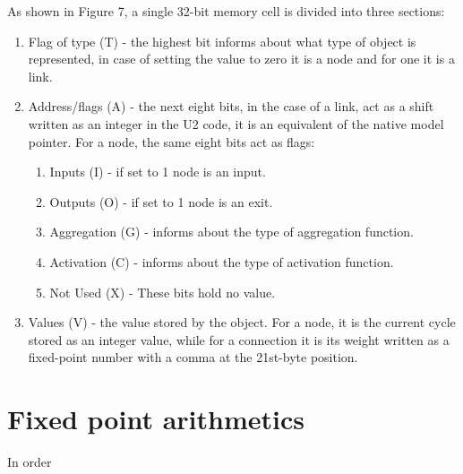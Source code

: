 As shown in Figure 7, a single 32-bit memory cell is divided into three sections: 
\begin{enumerate}
	\item Flag of type (T) - the highest bit informs about what type of object is represented,
		in case of setting the value to zero it is a node and for one it is a link.
	\item Address/flags (A) - the next eight bits, in the case of a link, act as a shift written
		as an integer in the U2 code, it is an equivalent of the native model pointer.
		For a node, the same eight bits act as flags:
		\begin{enumerate}
				\item Inputs (I) - if set to 1 node is an input.
				\item Outputs (O) - if set to 1 node is an exit.
				\item Aggregation (G) - informs about the type of aggregation function.
				\item Activation (C) - informs about the type of activation function.
				\item Not Used (X) - These bits hold no value. 
		\end{enumerate}
	\item Values (V) - the value stored by the object. For a node, it is the current
		cycle stored as an integer value, while for a connection it is its weight written as a
		fixed-point number with a comma at the 21st-byte position.
\end{enumerate}


\FloatBarrier
\section{Fixed point arithmetics}
In order
